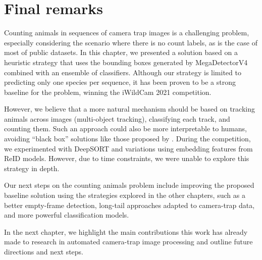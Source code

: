 \section{Final remarks}

Counting animals in sequences of camera trap images is a challenging problem,
especially considering the scenario where there is no count labels, as is
the case of most of public datasets. In this chapter, we presented a solution
based on a heuristic strategy that uses the bounding boxes generated by
MegaDetectorV4 combined with an ensemble of classifiers. Although our
strategy is limited to predicting only one species per sequence, it has been
proven to be a strong baseline for the problem, winning the iWildCam 2021
competition.

However, we believe that a more natural mechanism should be based on tracking
animals across images (multi-object tracking), classifying each track, and
counting them. Such an approach could also be more interpretable to humans,
avoiding ``black box'' solutions like those proposed by
\citet{norouzzadeh2018automatically}. During the competition, we experimented
with DeepSORT \citep{Wojke2017simple} and variations using embedding features
from ReID models. However, due to time constraints, we were unable to explore
this strategy in depth.

Our next steps on the counting animals problem include improving the proposed
baseline solution using the strategies explored in the other chapters, such as a
better empty-frame detection, long-tail approaches adapted to camera-trap data,
and more powerful classification models.

In the next chapter, we highlight the main contributions this work has already made to research in automated camera-trap image processing and outline future directions and next steps.